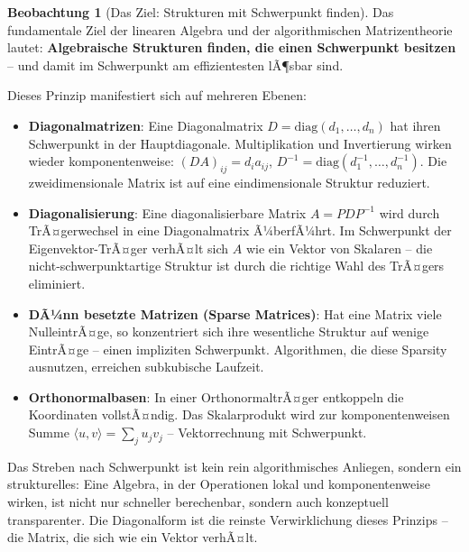 ﻿\documentclass[a4paper,12pt]{report}
\theoremstyle{definition}
\newtheorem{beobachtung}{Beobachtung}
\begin{document}
\begin{beobachtung}[Das Ziel: Strukturen mit Schwerpunkt finden]
    Das fundamentale Ziel der linearen Algebra und der algorithmischen
    Matrizentheorie lautet: \textbf{Algebraische Strukturen finden, die
    einen Schwerpunkt besitzen} -- und damit im Schwerpunkt am
    effizientesten lÃ¶sbar sind.

    Dieses Prinzip manifestiert sich auf mehreren Ebenen:
    \begin{itemize}
        \item[-] \textbf{Diagonalmatrizen}: Eine Diagonalmatrix
              $D = \mathrm{diag}(d_1, \dots, d_n)$ hat ihren Schwerpunkt
              in der Hauptdiagonale. Multiplikation und Invertierung
              wirken wieder komponentenweise: $(DA)_{ij} = d_i a_{ij}$,
              $D^{-1} = \mathrm{diag}(d_1^{-1}, \dots, d_n^{-1})$.
              Die zweidimensionale Matrix ist auf eine eindimensionale
              Struktur reduziert.
        \item[-] \textbf{Dia\-go\-nali\-sie\-rung}: Eine diagonalisierbare Matrix
              $A = PDP^{-1}$ wird durch TrÃ¤ger\-wechsel in eine Diagonalmatrix
              Ã¼berfÃ¼hrt. Im Schwerpunkt der Eigenvektor-TrÃ¤ger verhÃ¤lt sich $A$
              wie ein Vektor von Skalaren -- die nicht-schwerpunkt\-artige Struktur
              ist durch die richtige Wahl des TrÃ¤gers eliminiert.
        \item[-] \textbf{DÃ¼nn besetzte Matrizen (Sparse Matrices)}: Hat
              eine Matrix viele NulleintrÃ¤ge, so konzentriert sich ihre
              wesentliche Struktur auf wenige EintrÃ¤ge -- einen impliziten
              Schwerpunkt. Algorithmen, die diese Sparsity ausnutzen,
              erreichen subkubische Laufzeit.
        \item[-] \textbf{Orthonormalbasen}: In einer OrthonormaltrÃ¤ger
              entkoppeln die Koordinaten vollstÃ¤ndig. Das Skalarprodukt
              wird zur komponentenweisen Summe $\langle u, v \rangle =
              \sum_j u_j v_j$ -- Vektorrechnung mit Schwerpunkt.
    \end{itemize}

    Das Streben nach Schwerpunkt ist kein rein algorithmisches Anliegen,
    sondern ein strukturelles: Eine Algebra, in der Operationen lokal
    und komponentenweise wirken, ist nicht nur schneller berechenbar,
    sondern auch konzeptuell transparenter. Die Diagonalform ist die
    reinste Verwirklichung dieses Prinzips -- die Matrix, die sich
    wie ein Vektor verhÃ¤lt.
\end{beobachtung}
\end{document}
